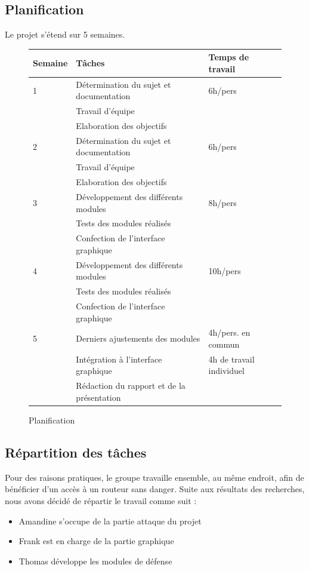 \documentclass[11pt]{article}
\begin{document}
\subsection{Planification}
Le projet s'étend sur 5 semaines.~\\
\begin{figure}[h]
\centering
\begin{tabular}{|l|l|l|}
\hline
Semaine & Tâches & Temps de travail \\ \hline

1& Détermination du sujet et documentation  & 6h/pers \\
& Travail d'équipe & \\
& Elaboration des objectifs &  ~\\ \hline

2& Détermination du sujet et documentation  & 6h/pers \\
& Travail d'équipe & \\
& Elaboration des objectifs &  ~\\ \hline

3& Développement des différents modules & 8h/pers \\
& Tests des modules réalisés \\
& Confection de l'interface graphique ~\\ \hline

4& Développement des différents modules & 10h/pers \\
& Tests des modules réalisés \\
& Confection de l'interface graphique ~\\ \hline

5& Derniers ajustements des modules & 4h/pers. en commun \\
& Intégration à l'interface graphique & 4h de travail individuel \\
& Rédaction du rapport et de la présentation  \\ \hline
\end{tabular}
\caption{Planification}
\end{figure}

\subsection{Répartition des tâches}
Pour des raisons pratiques, le groupe travaille ensemble, au même endroit, afin de bénéficier d'un accès à un routeur sans danger.
Suite aux résultats des recherches, nous avons décidé de répartir le travail comme suit : 
\begin{itemize}
	\item Amandine s'occupe de la partie attaque du projet
	\item Frank est en charge de la partie graphique
	\item Thomas développe les modules de défense
\end{itemize}
\end{document}
